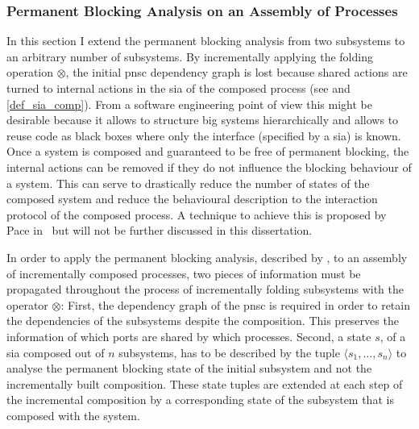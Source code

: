 \subsubsection{Permanent Blocking Analysis on an Assembly of Processes}
\label{sect_block_perm_assembly}
In this section I extend the permanent blocking analysis from two subsystems to an arbitrary number of subsystems.
By incrementally applying the folding operation $\otimes$, the initial \gls{pnsc} dependency graph is lost because shared actions are turned to internal actions in the \gls{sia} of the composed process (see \Def{\ref{def_proc_composed}} and \ref{def_sia_comp}).
From a software engineering point of view this might be desirable because it allows to structure big systems hierarchically and allows to reuse code as black boxes where only the interface (specified by a \gls{sia}) is known.
Once a system is composed and guaranteed to be free of permanent blocking, the internal actions can be removed if they do not influence the blocking behaviour of a system.
This can serve to drastically reduce the number of states of the composed system and reduce the behavioural description to the interaction protocol of the composed process.
A technique to achieve this is proposed by Pace \etal in~\cite{pace2003} but will not be further discussed in this dissertation.

In order to apply the permanent blocking analysis, described by \Equ{\ref{eq_sia_block}}, to an assembly of incrementally composed processes, two pieces of information must be propagated throughout the process of incrementally folding subsystems with the operator $\otimes$:
First, the dependency graph of the \gls{pnsc} is required in order to retain the dependencies of the subsystems despite the composition.
This preserves the information of which ports are shared by which processes.
Second, a state $s$, of a \gls{sia} composed out of $n$ subsystems, has to be described by the tuple $\langle s_1, \dots, s_n \rangle$ to analyse the permanent blocking state of the initial subsystem and not the incrementally built composition.
These state tuples are extended at each step of the incremental composition by a corresponding state of the subsystem that is composed with the system.

